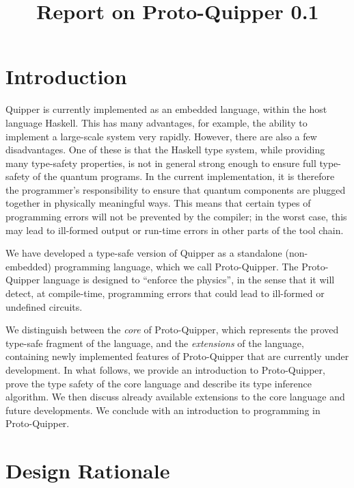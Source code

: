 \documentclass{article}
\title{\textbf{Report on Proto-Quipper 0.1}}
\date{}
\author{}
\begin{document}
\maketitle


\tableofcontents


\section{Introduction}

Quipper is currently implemented as an embedded language, within 
the host language Haskell. This has many advantages, for example, 
the ability to implement a large-scale system very rapidly. However, 
there are also a few disadvantages. One of these is that the Haskell 
type system, while providing many  type-safety properties, is not in 
general strong enough to ensure full type-safety of the quantum 
programs. In the current implementation, it is therefore the 
programmer's responsibility to ensure that quantum components are 
plugged together in physically meaningful ways. This means that 
certain types of programming errors will not be prevented by the 
compiler; in the worst case, this may lead to ill-formed output or 
run-time errors in other parts of the tool chain.

We have developed a type-safe version of Quipper as a standalone 
(non-embedded) programming language, which we call Proto-Quipper. 
The Proto-Quipper language is designed to ``enforce the physics'', 
in the sense that it will detect, at compile-time, programming 
errors that could lead to ill-formed or undefined circuits. 

We distinguish between the \emph{core} of Proto-Quipper, which 
represents the proved type-safe fragment of the language, and 
the \emph{extensions} of the language, containing newly 
implemented features of Proto-Quipper that are currently under 
development. In what follows, we provide an introduction to 
Proto-Quipper, prove the type safety of the core language and 
describe its type inference algorithm. We then discuss already 
available extensions to the core language and future 
developments. We conclude with an introduction to programming 
in Proto-Quipper.


\section{Design Rationale}
\end{document}
